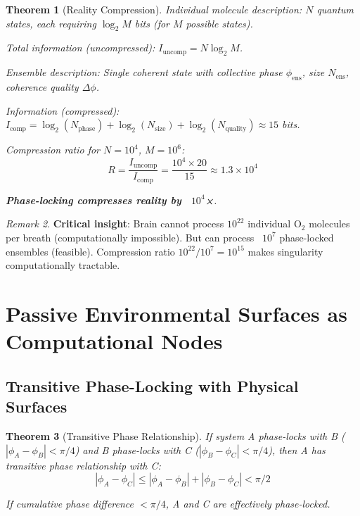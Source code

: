 \documentclass[11pt,a4paper]{article}
\newtheorem{theorem}{Theorem}[section]
\theoremstyle{definition}
\theoremstyle{remark}
\newtheorem{remark}[theorem]{Remark}
\begin{document}
\begin{theorem}[Reality Compression]
\label{thm:compression}
Individual molecule description: $N$ quantum states, each requiring $\log_2 M$ bits (for $M$ possible states).

Total information (uncompressed): $I_{\text{uncomp}} = N \log_2 M$.

Ensemble description: Single coherent state with collective phase $\phi_{\text{ens}}$, size $N_{\text{ens}}$, coherence quality $\Delta\phi$.

Information (compressed): $I_{\text{comp}} = \log_2(N_{\text{phase}}) + \log_2(N_{\text{size}}) + \log_2(N_{\text{quality}}) \approx 15$ bits.

Compression ratio for $N = 10^4$, $M = 10^6$:
\begin{equation}
R = \frac{I_{\text{uncomp}}}{I_{\text{comp}}} = \frac{10^4 \times 20}{15} \approx 1.3 \times 10^4
\end{equation}

\textbf{Phase-locking compresses reality by ~$10^4$×}.
\end{theorem}

\begin{remark}
\textbf{Critical insight}: Brain cannot process $10^{22}$ individual O$_2$ molecules per breath (computationally impossible). But can process ~$10^7$ phase-locked ensembles (feasible). Compression ratio $10^{22}/10^7 = 10^{15}$ makes singularity computationally tractable.
\end{remark}

\section{Passive Environmental Surfaces as Computational Nodes}

\subsection{Transitive Phase-Locking with Physical Surfaces}

\begin{theorem}[Transitive Phase Relationship]
\label{thm:transitive}
If system A phase-locks with B ($|\phi_A - \phi_B| < \pi/4$) and B phase-locks with C ($|\phi_B - \phi_C| < \pi/4$), then A has transitive phase relationship with C:
\begin{equation}
|\phi_A - \phi_C| \leq |\phi_A - \phi_B| + |\phi_B - \phi_C| < \pi/2
\end{equation}

If cumulative phase difference $< \pi/4$, A and C are effectively phase-locked.
\end{theorem}
\end{document}

